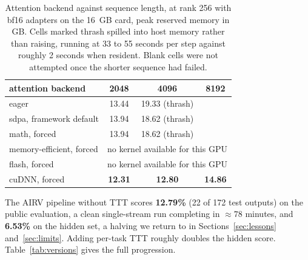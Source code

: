 \documentclass[11pt]{article}
\begin{document}
\begin{table}[H]
\centering
\caption{Attention backend against sequence length, at rank 256 with bf16 adapters on the 16~GB card, peak
reserved memory in GB. Cells marked thrash spilled into host memory rather than raising, running at 33 to
55 seconds per step against roughly 2 seconds when resident. Blank cells were not attempted once the
shorter sequence had failed.}
\label{tab:attn}
\begin{tabular}{lccc}
\toprule
attention backend & 2048 & 4096 & 8192 \\
\midrule
eager                      & 13.44 & 19.33 (thrash) & \\
sdpa, framework default    & 13.94 & 18.62 (thrash) & \\
math, forced               & 13.94 & 18.62 (thrash) & \\
memory-efficient, forced   & \multicolumn{3}{c}{no kernel available for this GPU} \\
flash, forced              & \multicolumn{3}{c}{no kernel available for this GPU} \\
cuDNN, forced              & \textbf{12.31} & \textbf{12.80} & \textbf{14.86} \\
\bottomrule
\end{tabular}
\end{table}

The AIRV pipeline without TTT scores \textbf{12.79\%} (22 of 172 test outputs) on the public
evaluation, a clean single-stream run completing in $\approx 78$ minutes, and \textbf{6.53\%} on the
hidden set, a halving we return to in Sections~\ref{sec:lessons} and~\ref{sec:limits}. Adding per-task
TTT roughly doubles the hidden score. Table~\ref{tab:versions} gives the full progression.
\end{document}
